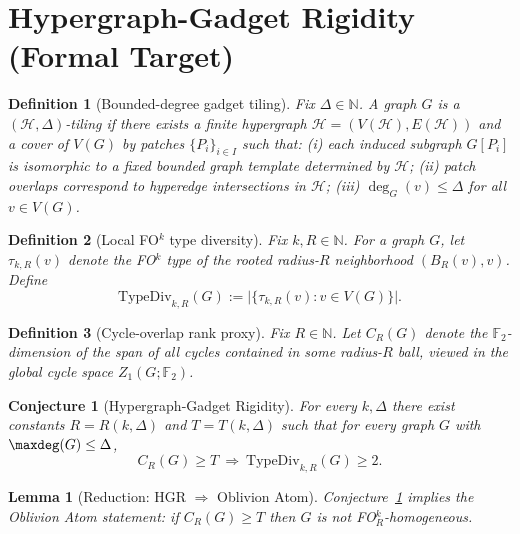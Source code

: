 \documentclass[11pt]{article}
\newtheorem{definition}{Definition}
\newtheorem{conjecture}{Conjecture}
\newtheorem{lemma}{Lemma}
\begin{document}
\section*{Hypergraph-Gadget Rigidity (Formal Target)}

\begin{definition}[Bounded-degree gadget tiling]
Fix $\Delta\in\mathbb N$. A graph $G$ is a \emph{$(\mathcal H,\Delta)$-tiling} if there exists a finite hypergraph
$\mathcal H=(V(\mathcal H),E(\mathcal H))$ and a cover of $V(G)$ by patches $\{P_i\}_{i\in I}$ such that:
(i) each induced subgraph $G[P_i]$ is isomorphic to a fixed bounded graph template determined by $\mathcal H$;
(ii) patch overlaps correspond to hyperedge intersections in $\mathcal H$;
(iii) $\deg_G(v)\le \Delta$ for all $v\in V(G)$.
\end{definition}

\begin{definition}[Local FO$^k$ type diversity]
Fix $k,R\in\mathbb N$. For a graph $G$, let $\tau_{k,R}(v)$ denote the FO$^k$ type of the rooted radius-$R$
neighborhood $(B_R(v),v)$. Define
\[
\mathrm{TypeDiv}_{k,R}(G):=\bigl|\{\tau_{k,R}(v): v\in V(G)\}\bigr|.
\]
\end{definition}

\begin{definition}[Cycle-overlap rank proxy]
Fix $R\in\mathbb N$. Let $C_R(G)$ denote the $\mathbb F_2$-dimension of the span of all cycles contained in some
radius-$R$ ball, viewed in the global cycle space $Z_1(G;\mathbb F_2)$.
\end{definition}

\begin{conjecture}[Hypergraph-Gadget Rigidity]\label{conj:HGR}
For every $k,\Delta$ there exist constants $R=R(k,\Delta)$ and $T=T(k,\Delta)$ such that for every graph $G$
with $\maxdeg(G)\le \Delta$,
\[
C_R(G)\ge T \ \Longrightarrow\ \mathrm{TypeDiv}_{k,R}(G)\ge 2.
\]
\end{conjecture}

\begin{lemma}[Reduction: HGR $\Rightarrow$ Oblivion Atom]
Conjecture~\ref{conj:HGR} implies the Oblivion Atom statement:
if $C_R(G)\ge T$ then $G$ is not FO$^k_R$-homogeneous.
\end{lemma}
\end{document}
